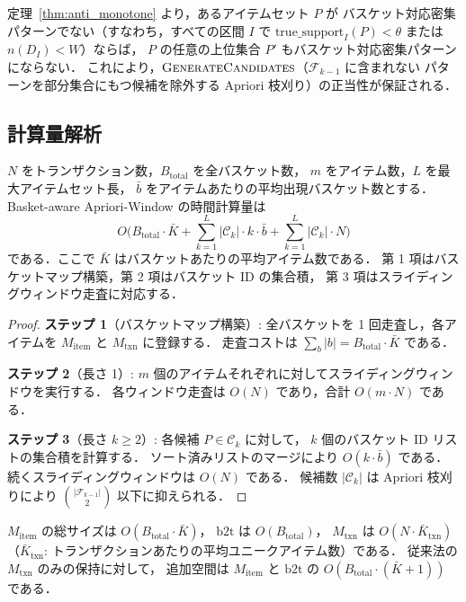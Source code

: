 定理~\ref{thm:anti_monotone} より，あるアイテムセット $P$ が
バスケット対応密集パターンでない（すなわち，すべての区間 $I$ で
$\text{true\_support}_I(P) < \theta$ または $n(D_I) < W$）ならば，
$P$ の任意の上位集合 $P'$ もバスケット対応密集パターンにならない．
これにより，$\Call{GenerateCandidates}{}$（$\mathcal{F}_{k-1}$ に含まれない
パターンを部分集合にもつ候補を除外する Apriori 枝刈り）の正当性が保証される．

\subsection{計算量解析}
\label{sec:complexity}

\begin{theorem}[時間計算量]
\label{thm:complexity}
$N$ をトランザクション数，$B_{\text{total}}$ を全バスケット数，
$m$ をアイテム数，$L$ を最大アイテムセット長，
$\bar{b}$ をアイテムあたりの平均出現バスケット数とする．
Basket-aware Apriori-Window の時間計算量は
\begin{equation}
O\bigl(B_{\text{total}} \cdot \bar{K} + \sum_{k=1}^{L} |\mathcal{C}_k| \cdot k \cdot \bar{b} + \sum_{k=1}^{L} |\mathcal{C}_k| \cdot N\bigr)
\end{equation}
である．ここで $\bar{K}$ はバスケットあたりの平均アイテム数である．
第 1 項はバスケットマップ構築，第 2 項はバスケット ID の集合積，
第 3 項はスライディングウィンドウ走査に対応する．
\end{theorem}

\begin{proof}
\textbf{ステップ 1}（バスケットマップ構築）:
全バスケットを 1 回走査し，各アイテムを $M_{\text{item}}$ と $M_{\text{txn}}$ に登録する．
走査コストは $\sum_{b} |b| = B_{\text{total}} \cdot \bar{K}$ である．

\textbf{ステップ 2}（長さ 1）:
$m$ 個のアイテムそれぞれに対してスライディングウィンドウを実行する．
各ウィンドウ走査は $O(N)$ であり，合計 $O(m \cdot N)$ である．

\textbf{ステップ 3}（長さ $k \geq 2$）:
各候補 $P \in \mathcal{C}_k$ に対して，
$k$ 個のバスケット ID リストの集合積を計算する．
ソート済みリストのマージにより $O(k \cdot \bar{b})$ である．
続くスライディングウィンドウは $O(N)$ である．
候補数 $|\mathcal{C}_k|$ は Apriori 枝刈りにより
$\binom{|\mathcal{F}_{k-1}|}{2}$ 以下に抑えられる．
\end{proof}

\begin{proposition}[空間計算量]
\label{prop:space}
$M_{\text{item}}$ の総サイズは $O(B_{\text{total}} \cdot \bar{K})$，
$\text{b2t}$ は $O(B_{\text{total}})$，
$M_{\text{txn}}$ は $O(N \cdot \bar{K}_{\text{txn}})$
（$\bar{K}_{\text{txn}}$: トランザクションあたりの平均ユニークアイテム数）である．
従来法の $M_{\text{txn}}$ のみの保持に対して，
追加空間は $M_{\text{item}}$ と $\text{b2t}$ の $O(B_{\text{total}} \cdot (\bar{K}+1))$ である．
\end{proposition}

